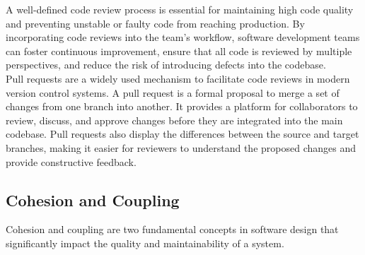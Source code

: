 A well-defined code review process is essential for maintaining high code quality and preventing unstable or faulty code from reaching production. By incorporating code reviews into the team's workflow, software development teams can foster continuous improvement, ensure that all code is reviewed by multiple perspectives, and reduce the risk of introducing defects into the codebase. \cite{gitlab:code-review} \\

Pull requests are a widely used mechanism to facilitate code reviews in modern version control systems. A pull request is a formal proposal to merge a set of changes from one branch into another. It provides a platform for collaborators to review, discuss, and approve changes before they are integrated into the main codebase. Pull requests also display the differences between the source and target branches, making it easier for reviewers to understand the proposed changes and provide constructive feedback. \cite{github:pr}

\subsection{Cohesion and Coupling}




Cohesion and coupling are two fundamental concepts in software design that significantly impact the quality and maintainability of a system. \\

